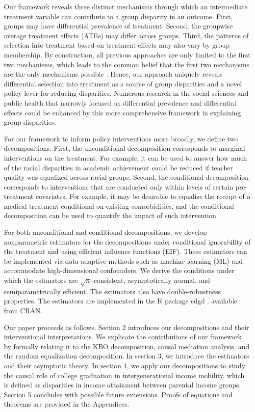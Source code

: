 \documentclass[12pt,a4paper]{article}
\begin{document}
Our framework reveals three distinct mechanisms through which an intermediate treatment variable can contribute to a group disparity in an outcome. First, groups may have differential prevalence of treatment. Second, the groupwise average treatment effects (ATEs) may differ across groups. Third, the patterns of selection into treatment based on treatment effects may also vary by group membership. By construction, all previous approaches are only limited to the first two mechanisms, which leads to the common belief that the first two mechanisms are the only mechanisms possible \citep{ward_how_2019, diderichsen_differential_2019}. Hence, our approach uniquely reveals differential selection into treatment as a source of group disparities and a novel policy lever for reducing disparities. Numerous research in the social sciences and public health that narrowly focused on differential prevalence and differential effects could be enhanced by this more comprehensive framework in explaining group disparities. 

For our framework to inform policy interventions more broadly, we define two decompositions. First, the unconditional decomposition corresponds to marginal interventions on the treatment. For example, it can be used to answer how much of the racial disparities in academic achievement could be reduced if teacher quality was equalized across racial groups. Second, the conditional decomposition corresponds to interventions that are conducted only within levels of certain pre-treatment covariates. For example, it may be desirable to equalize the receipt of a medical treatment conditional on existing comorbidities, and the conditional decomposition can be used to quantify the impact of such intervention. 

For both unconditional and conditional decompositions, we develop nonparametric estimators for the decompositions under conditional ignorability of the treatment and using efficient influence functions (EIF). These estimators can be implemented via data-adaptive methods such as machine learning (ML) and accommodate high-dimensional confounders. We  derive the conditions under which the estimators are $\sqrt{n}$-consistent, asymptotically normal, and semiparametrically efficient. The estimators also have double-robustness properties. The estimators are implemented in the R \citep{R_core_team_2023} package cdgd \citep{yu_2023}, available from CRAN.

Our paper proceeds as follows. Section 2 introduces our decompositions and their interventional interpretations. We explicate the contributions of our framework by formally relating it to the KBO decomposition, causal mediation analysis, and the random equalization decomposition. In section 3, we introduce the estimators and their asymptotic theory. In section 4, we apply our decompositions to study the causal role of college graduation in intergenerational income mobility, which is defined as disparities in income attainment between parental income groups. Section 5 concludes with possible future extensions. Proofs of equations and theorems are provided in the Appendices.
\end{document}
